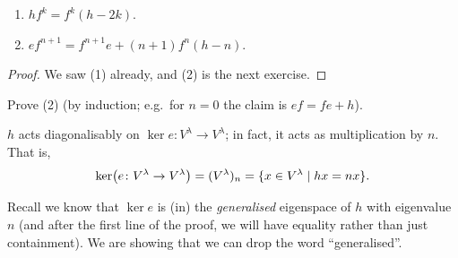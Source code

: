 
\begin{lemma}\leavevmode
\begin{enumerate}
  \item $hf^k = f^k(h - 2k)$.
  \item $ef^{n+1} = f^{n+1}e + (n + 1)f^n(h - n)$.
\end{enumerate}
\end{lemma}

\begin{proof}
We saw (1) already, and (2) is the next exercise.
\end{proof}

\begin{exercise}
Prove (2) (by induction; e.g.\ for $n = 0$ the claim is $ef = fe + h$).
\end{exercise}

\begin{proposition}
$h$ acts diagonalisably on $\ker e\colon V^\lambda \to V^\lambda$; in fact, it
acts as multiplication by $n$. That is,
\[
  \ker\bigl(e\colon V^\lambda \to V^\lambda\bigr) = (V^\lambda)_n
    = \{x \in V^\lambda \mid hx = nx\}.
\]
\end{proposition}

Recall we know that $\ker e$ is (in) the \emph{generalised} eigenspace of $h$
with eigenvalue $n$ (and after the first line of the proof, we will have
equality rather than just containment). We are showing that we can drop the
word ``generalised''.

